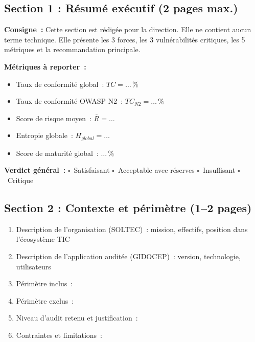 \documentclass[12pt,a4paper,oneside]{report}
\begin{document}
\subsection*{Section 1 : R\'esum\'e ex\'ecutif (2 pages max.)}

\begin{encadre}
\textbf{Consigne~:} Cette section est r\'edig\'ee pour la direction. Elle ne
contient aucun terme technique. Elle pr\'esente les 3 forces, les 3
vuln\'erabilit\'es critiques, les 5 m\'etriques et la recommandation principale.

\vspace{0.3cm}
\textbf{M\'etriques \`a reporter~:}
\begin{itemize}[label={\color{gold}}, leftmargin=*]
\item Taux de conformit\'e global~: $TC = \ldots\,\%$
\item Taux de conformit\'e OWASP N2~: $TC_{N2} = \ldots\,\%$
\item Score de risque moyen~: $\bar{R} = \ldots$
\item Entropie globale~: $H_{global} = \ldots$
\item Score de maturit\'e global~: $\ldots\,\%$
\end{itemize}

\vspace{0.3cm}
\textbf{Verdict g\'en\'eral~:}
$\square$~Satisfaisant \quad
$\square$~Acceptable avec r\'eserves \quad
$\square$~Insuffisant \quad
$\square$~Critique
\end{encadre}

\vspace{0.4cm}

\subsection*{Section 2 : Contexte et p\'erim\`etre (1--2 pages)}

\begin{encadre}
\begin{enumerate}[leftmargin=*, itemsep=4pt]
\item Description de l'organisation (SOLTEC)~: mission, effectifs, position dans l'\'ecosyst\`eme TIC
\item Description de l'application audit\'ee (GIDOCEP)~: version, technologie, utilisateurs
\item P\'erim\`etre inclus~: \dotfill
\item P\'erim\`etre exclus~: \dotfill
\item Niveau d'audit retenu et justification~: \dotfill
\item Contraintes et limitations~: \dotfill
\end{enumerate}
\end{encadre}
\end{document}
